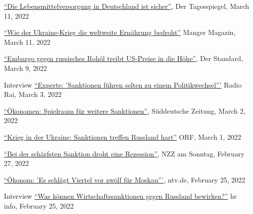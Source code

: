 \documentclass{article}
\begin{document}
\begin{minipage}[t]{0.12\textwidth}
\hspace{0mm}
\end{minipage}
\hspace{5mm}
\begin{minipage}[t]{0.8\textwidth}
    \href{https://www.tagesspiegel.de/wirtschaft/agrarminister-cem-oezdemir-zu-den-folgen-des-kriegs-die-lebensmittelversorgung-in-deutschland-ist-sicher/28155160.html}{``Die Lebensmittelversorgung in Deutschland ist sicher''}, Der Tagesspiegel, March 11, 2022 \par
    \href{https://www.manager-magazin.de/politik/wie-es-um-die-ernaehrungssicherheit-steht-ausfall-der-ukraine-als-getreide-exporteur-trifft-afrika-hart-a-fdf304e9-e490-4d78-8cf1-f56464958af1}{``Wie der Ukraine-Krieg die weltweite Ernährung bedroht''} Manger Magazin, March 11, 2022 \par
    \href{https://www.derstandard.at/story/2000133979024/embargo-gegen-russisches-rohoel-treibt-us-preise-in-die-hoehe}{``Embargo gegen russisches Rohöl treibt US-Preise in die Höhe''}, Der Standard, March 9, 2022 \par
    Interview \href{https://www.rainews.it/tgr/tagesschau/audio/2022/03/tag-Hendrik-Mahlkow-Institut-fuer-Weltwirtschaft-Kiel-Sanktionen-Russland-Ukrainekrieg-4be0c70d-61c5-4749-9088-689b3ee625f2.html}{``Experte: 'Sanktionen führen selten zu einem Politikwechsel'''} Radio Rai, March 3, 2022 \par
    \href{https://www.sueddeutsche.de/wirtschaft/strafmassnahmen-oekonomen-spielraum-fuer-weitere-sanktionen-1.5538934}{``Ökonomen: Spielraum für weitere Sanktionen''}, Süddeutsche Zeitung, March 2, 2022 \par
    \href{https://orf.at/stories/3250156/}{``Krieg in der Ukraine: Sanktionen treffen Russland hart''} ORF, March 1, 2022 \par
    \href{https://magazin.nzz.ch/nzz-am-sonntag/international/bei-der-schaerfsten-sanktion-droht-eine-rezession-ld.1671972?reduced=true}{``Bei der schärfsten Sanktion droht eine Rezession''}, NZZ am Sonntag, February 27, 2022 \par
    \href{https://www.n-tv.de/wirtschaft/Okonom-Es-schlaegt-Viertel-vor-zwoelf-fuer-Moskau-article23155253.html}{``Ökonom: 'Es schlägt Viertel vor zwölf für Moskau'''}, ntv.de, February 25, 2022 \par
    Interview \href{https://www.hr-inforadio.de/programm/themen/ukraine-krieg-was-koennen-wirtschaftssanktionen-gegen-russland-bewirken,ukraine-konflikt-was-koennen-sanktionen-bewirken-100.html}{``Was können Wirtschaftssanktionen gegen Russland bewirken?''} hr info, February 25, 2022 \par

\end{minipage}
\end{document}
